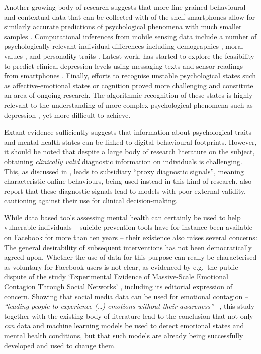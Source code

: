 \documentclass[11pt,theapa]{article}
\theoremstyle{plain}
\begin{document}
Another growing body of research suggests that more fine-grained behavioural and contextual data that can be collected with of-the-shelf smartphones allow for similarly accurate predictions of psychological phenomena with much smaller samples \cite{Stachl2020PNAS,Panicheva2022}. Computational inferences from mobile sensing data include a number of psychologically-relevant individual differences including demographics \cite{Koch2022,Malmi2016,Sundsoy2016}, moral values \cite{Kalimeri2019}, and personality traits \cite{Stachl2020PNAS}.
Latest work, has started to explore the feasibility to predict clinical depression levels using messaging texts and sensor readings from smartphones \cite{Liu2022,Mueller2021}.
Finally, efforts to recognise unstable psychological states such as affective-emotional states \cite{Israel2020} or cognition \cite{Gordon2019,Rauber2019} proved more challenging and constitute an area of ongoing research. The algorithmic recognition of these states is highly relevant to the understanding of more complex psychological phenomena such as depression \cite{Liu2022}, yet more difficult to achieve.

Extant evidence sufficiently suggests that information about psychological traits and mental health states can be linked to digital behavioural footprints. However, it should be noted that despite a large body of research literature on the subject, obtaining \textit{clinically valid} diagnostic information on individuals is challenging. This, as discussed in \cite{mental_health_some2019}, leads to subsidiary ``proxy diagnostic signals'', meaning characteristic online behaviours, being used instead in this kind of research. \cite{mental_health_some2019} also report that these diagnostic signals lead to models with poor external validity, cautioning against their use for clinical decision-making.

While data based tools assessing mental health can certainly be used to help vulnerable individuals -- suicide prevention tools have for instance been available on Facebook for more than ten years \cite{facebook_suicide_prevention} -- their existence also raises several concerns: The general desirability of subsequent interventions has not been democratically agreed upon. Whether the use of data for this purpose can really be characterised as voluntary for Facebook users is not clear, as evidenced by e.g.\ the public dispute of the study `Experimental Evidence of Massive-Scale Emotional Contagion Through Social Networks' \cite{Kramer8788}, including its editorial expression of concern. Showing that social media data can be used for emotional contagion -- \textit{``leading people to experience (\dots) emotions without their awareness''} --, this study together with the existing body of literature lead to the conclusion that not only \textit{can} data and machine learning models be used to detect emotional states and mental health conditions, but that such models are already being successfully developed and used to change them.
\end{document}
